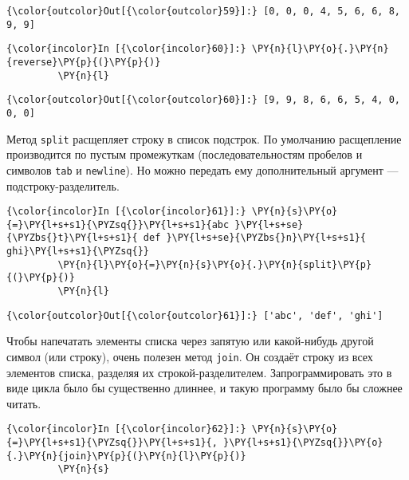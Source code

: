             \begin{Verbatim}[commandchars=\\\{\}]
{\color{outcolor}Out[{\color{outcolor}59}]:} [0, 0, 0, 4, 5, 6, 6, 8, 9, 9]
\end{Verbatim}
        
    \begin{Verbatim}[commandchars=\\\{\}]
{\color{incolor}In [{\color{incolor}60}]:} \PY{n}{l}\PY{o}{.}\PY{n}{reverse}\PY{p}{(}\PY{p}{)}
         \PY{n}{l}
\end{Verbatim}

            \begin{Verbatim}[commandchars=\\\{\}]
{\color{outcolor}Out[{\color{outcolor}60}]:} [9, 9, 8, 6, 6, 5, 4, 0, 0, 0]
\end{Verbatim}
        
    Метод \texttt{split} расщепляет строку в список подстрок. По умолчанию
расщепление производится по пустым промежуткам (последовательностям
пробелов и символов \texttt{tab} и \texttt{newline}). Но можно передать
ему дополнительный аргумент --- подстроку-разделитель.

    \begin{Verbatim}[commandchars=\\\{\}]
{\color{incolor}In [{\color{incolor}61}]:} \PY{n}{s}\PY{o}{=}\PY{l+s+s1}{\PYZsq{}}\PY{l+s+s1}{abc }\PY{l+s+se}{\PYZbs{}t}\PY{l+s+s1}{ def }\PY{l+s+se}{\PYZbs{}n}\PY{l+s+s1}{ ghi}\PY{l+s+s1}{\PYZsq{}}
         \PY{n}{l}\PY{o}{=}\PY{n}{s}\PY{o}{.}\PY{n}{split}\PY{p}{(}\PY{p}{)}
         \PY{n}{l}
\end{Verbatim}

            \begin{Verbatim}[commandchars=\\\{\}]
{\color{outcolor}Out[{\color{outcolor}61}]:} ['abc', 'def', 'ghi']
\end{Verbatim}
        
    Чтобы напечатать элементы списка через запятую или какой-нибудь другой
символ (или строку), очень полезен метод \texttt{join}. Он создаёт
строку из всех элементов списка, разделяя их строкой-разделителем.
Запрограммировать это в виде цикла было бы существенно длиннее, и такую
программу было бы сложнее читать.

    \begin{Verbatim}[commandchars=\\\{\}]
{\color{incolor}In [{\color{incolor}62}]:} \PY{n}{s}\PY{o}{=}\PY{l+s+s1}{\PYZsq{}}\PY{l+s+s1}{, }\PY{l+s+s1}{\PYZsq{}}\PY{o}{.}\PY{n}{join}\PY{p}{(}\PY{n}{l}\PY{p}{)}
         \PY{n}{s}
\end{Verbatim}

